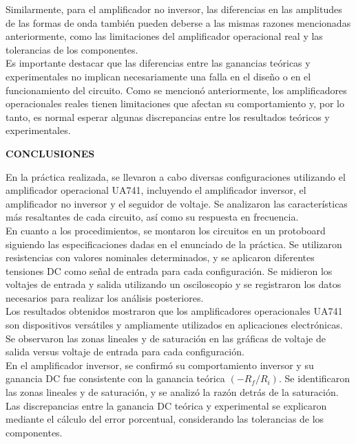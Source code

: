 \documentclass[12pt]{article}
\begin{document}
	Similarmente, para el amplificador no inversor, las diferencias en las amplitudes de las formas de onda también pueden deberse a las mismas razones mencionadas anteriormente, como las limitaciones del amplificador operacional real y las tolerancias de los componentes.\\
	
	Es importante destacar que las diferencias entre las ganancias teóricas y experimentales no implican necesariamente una falla en el diseño o en el funcionamiento del circuito. Como se mencionó anteriormente, los amplificadores operacionales reales tienen limitaciones que afectan su comportamiento y, por lo tanto, es normal esperar algunas discrepancias entre los resultados teóricos y experimentales.\\
	
	\newpage
	
	\begin{center}
		\textbf{\large CONCLUSIONES}\\
	\end{center}
	
	En la práctica realizada, se llevaron a cabo diversas configuraciones utilizando el amplificador operacional UA741, incluyendo el amplificador inversor, el amplificador no inversor y el seguidor de voltaje. Se analizaron las características más resaltantes de cada circuito, así como su respuesta en frecuencia.\\
	
	En cuanto a los procedimientos, se montaron los circuitos en un protoboard siguiendo las especificaciones dadas en el enunciado de la práctica. Se utilizaron resistencias con valores nominales determinados, y se aplicaron diferentes tensiones DC como señal de entrada para cada configuración. Se midieron los voltajes de entrada y salida utilizando un osciloscopio y se registraron los datos necesarios para realizar los análisis posteriores.\\
	
	Los resultados obtenidos mostraron que los amplificadores operacionales UA741 son dispositivos versátiles y ampliamente utilizados en aplicaciones electrónicas. Se observaron las zonas lineales y de saturación en las gráficas de voltaje de salida versus voltaje de entrada para cada configuración.\\
	
	En el amplificador inversor, se confirmó su comportamiento inversor y su ganancia DC fue consistente con la ganancia teórica $(-R_{f}/R_{i})$. Se identificaron las zonas lineales y de saturación, y se analizó la razón detrás de la saturación. Las discrepancias entre la ganancia DC teórica y experimental se explicaron mediante el cálculo del error porcentual, considerando las tolerancias de los componentes.\\
	
\end{document}

